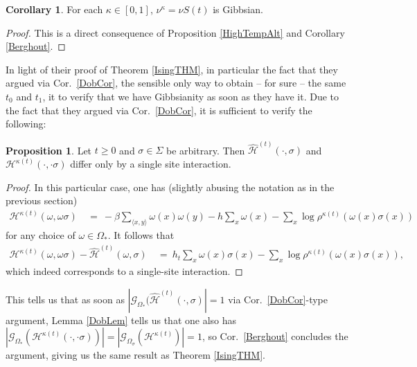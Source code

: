 \documentclass[12pt]{article}
\newcommand{\G}{\mathcal{G}}
\renewcommand{\H}{\mathcal{H}}
\newcommand{\pika}{\boldsymbol{\cdot}}
\newcommand{\1}{\mathbbm{1}}
\renewcommand{\sp}[1]{\langle #1\rangle}
\newcommand{\5}{\vspace{0.5cm}}
\renewcommand{\hat}{\widehat}
\theoremstyle{definition}
\newtheorem{prop}[thm]{Proposition}
\newtheorem{cor}[thm]{Corollary}
\begin{document}
\begin{cor}
For each $\kappa\in[0,1]$, $\nu^\kappa=\nu S(t)$ is Gibbsian.
\end{cor}

\begin{proof}
This is a direct consequence of Proposition \ref{HighTempAlt} and Corollary \ref{Berghout}.
\end{proof}

In light of their proof of Theorem \ref{IsingTHM}, in particular the fact that they argued via Cor.~\ref{DobCor}, the sensible only way to obtain -- for sure -- the same $t_0$ and $t_1$, it to verify that we have Gibbsianity as soon as they have it. Due to the fact that they argued via Cor.~\ref{DobCor}, it is sufficient to verify the following:
\begin{prop} Let $t\geq 0$ and $\sigma\in\Sigma$ be arbitrary. Then $\hat{\H}^{(t)}(\pika,\sigma)$ and $\H^{\kappa(t)}(\pika,\pika\sigma)$ differ only by a single site interaction.
\end{prop}
\begin{proof}
In this particular case, one has (slightly abusing the notation as in the previous section)
\begin{align*}
\H^{\kappa(t)}(\omega,\omega\sigma) ~&=~ -\beta\sum_{\sp{x,y}}\omega(x)\omega(y) - h\sum_{x}\omega(x) -\sum_{x}\log\rho^{\kappa(t)}(\omega(x)\sigma(x))
\end{align*}
for any choice of $\omega\in\Omega_*$. It follows that
\begin{align*}
\H^{\kappa(t)}(\omega,\omega\sigma) - \hat{\H}^{(t)}(\omega,\sigma) ~&=~ h_t\sum_{x}\omega(x)\sigma(x) - \sum_{x}\log\rho^{\kappa(t)}(\omega(x)\sigma(x)),
\end{align*}
which indeed corresponds to a single-site interaction.
\end{proof}

This tells us that as soon as $|\G_{\Omega_*}(\hat{\H}^{(t)}(\pika,\sigma)|=1$ via Cor.~\ref{DobCor}-type argument, Lemma \ref{DobLem} tells us that one also has $|\G_{\Omega_*}(\H^{\kappa(t)}(\pika,\pika\sigma))|=|\G_{\Omega_\sigma}(\H^{\kappa(t)})|=1$, so Cor.~\ref{Berghout} concludes the argument, giving us the same result as Theorem \ref{IsingTHM}.

\pagebreak

\end{document}
